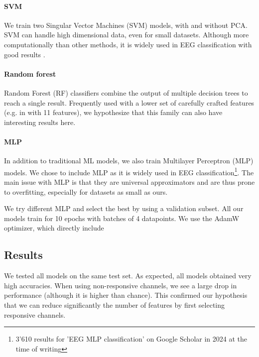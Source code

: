 \documentclass[10pt,conference,compsocconf]{IEEEtran}
\begin{document}
\paragraph{SVM}
We train two Singular Vector Machines (SVM) models, with and without PCA. SVM can handle high dimensional data, even for small datasets. Although more computationally than other methods, it is widely used in EEG classification with good results \cite{knn_svm_review}.

\paragraph{Random forest}
Random Forest (RF) classifiers combine the output of multiple decision trees to reach a single result. Frequently used with a lower set of carefully crafted features (e.g. in \cite{eegrfclassif} with 11 features), we hypothesize that this family can also have interesting results here.

\paragraph{MLP}
In addition to traditional ML models, we also train Multilayer Perceptron (MLP) models. We chose to include MLP as it is widely used in EEG classification\footnote{3'610 results for 'EEG MLP classification' on Google Scholar in 2024 at the time of writing}. The main issue with MLP is that they are universal approximators and are thus prone to overfitting, especially for datasets as small as ours.

We try different MLP and select the best by using a validation subset. All our models train for 10 epochs with batches of 4 datapoints. We use the AdamW optimizer, which directly include

\subsection{Results}
We tested all models on the same test set. As expected, all models obtained very high accuracies. When using non-responsive channels, we see a large drop in performance (although it is higher than chance). This confirmed our hypothesis that we can reduce significantly the number of features by first selecting responsive channels.
\end{document}
